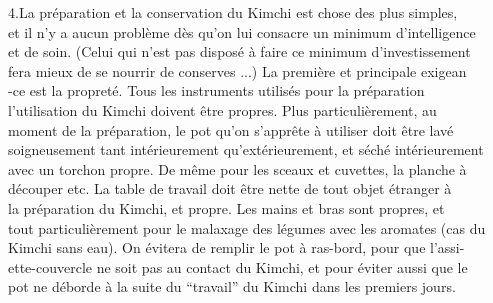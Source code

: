 4.\quad La préparation et la conservation du Kimchi est chose des plus simples,\\
et il n'y a aucun problème dès qu'on lui consacre un minimum d'intelligence\\
et de soin. (Celui qui n'est pas disposé à faire ce minimum d'investissement\\
fera mieux de se nourrir de conserves ...) La première et principale exigean\\
-ce est la propreté. Tous les instruments utilisés pour la préparation \\
l'utilisation du Kimchi doivent être propres. Plus particulièrement, au\\
moment de la préparation, le pot qu'on s'apprête à utiliser doit être lavé\\
soigneusement tant intérieurement qu'extérieurement, et séché intérieurement\\
avec un torchon propre. De même pour les sceaux et cuvettes, la planche à\\
découper etc. La table de travail doit être nette de tout objet étranger à\\
la préparation du Kimchi, et propre. Les mains et bras sont propres, et\\
tout particulièrement pour le malaxage des légumes avec les aromates (cas du\\
Kimchi sans eau). On évitera de remplir le pot à ras-bord, pour que l'assi-\\
ette-couvercle ne soit pas au contact du Kimchi, et pour éviter aussi que le\\
pot ne déborde à la suite du ``travail'' du Kimchi dans les premiers jours.

